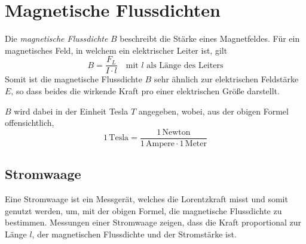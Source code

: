 \documentclass{article}
\newcommand{\ounit}[1]{
 1\,\text{#1} 
}
\begin{document}
\section{Magnetische Flussdichten}
\begin{minipage}{\dimexpr\linewidth-5cm} 
Die \emph{magnetische Flussdichte} $B$ beschreibt die Stärke eines Magnetfeldes. Für ein magnetisches Feld, in welchem ein elektrischer Leiter ist, gilt
\[
 B = \frac{F_L}{I \cdot l} 
 \quad \text{mit $l$ als Länge des Leiters} 
\]
Somit ist die magnetische Flussdichte $B$ sehr ähnlich zur elektrischen Feldstärke $E$, so dass beides die wirkende Kraft pro einer elektrischen Größe darstellt. \newline
\end{minipage} 
\hfill
\begin{minipage}{5cm}
 \center
\end{minipage}
$B$ wird dabei in der Einheit Tesla $T$ angegeben, wobei, aus der obigen Formel offensichtlich,
\[ 
 \ounit{Tesla} = \frac{\ounit{Newton}}{\ounit{Ampere} \cdot \ounit{Meter}}
\]
 
\subsection{Stromwaage}
Eine Stromwaage ist ein Messgerät, welches die Lorentzkraft misst und somit genutzt werden, um, mit der obigen Formel, die magnetische Flussdichte zu bestimmen. %
Messungen einer Stromwaage zeigen, dass die Kraft proportional zur Länge $l$, der magnetischen Flussdichte und der Stromstärke ist.   
\end{document}
